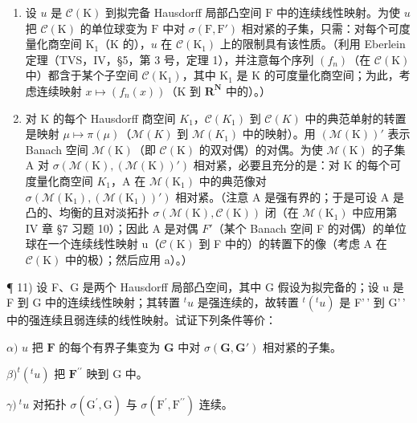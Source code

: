 \begin{enumerate}
\def\labelenumi{\alph{enumi})}
\item
  设 \(u\) 是 \(\mathcal{C}(\mathrm{K})\) 到拟完备 Hausdorff 局部凸空间 \(\mathrm{F}\) 中的连续线性映射。为使 \(u\) 把 \(\mathcal{C}(\mathrm{K})\) 的单位球变为 \(\mathrm{F}\) 中对 \(\sigma(\mathrm{F},\mathrm{F}')\) 相对紧的子集，只需：对每个可度量化商空间 \(\mathrm{K}_1\)（\(\mathrm{K}\) 的），\(u\) 在 \(\mathcal{C}(\mathrm{K}_1)\) 上的限制具有该性质。（利用 Eberlein 定理（TVS，IV，§5，第 3 号，定理 1），并注意每个序列 \((f_n)\)（在 \(\mathcal{C}(\mathrm{K})\) 中）都含于某个子空间 \(\mathcal{C}(\mathrm{K}_1)\)，其中 \(\mathrm{K}_1\) 是 \(\mathrm{K}\) 的可度量化商空间；为此，考虑连续映射 \(x \mapsto (f_n(x))\)（\(\mathrm{K}\) 到 \(\mathbf{R}^{\mathbf{N}}\) 中的）。）
\item
  对 K 的每个 Hausdorff 商空间 \(K_{1}\)，\(\mathcal{C}(K_{1})\) 到 \(\mathcal{C}(K)\) 中的典范单射的转置是映射 \(\mu\mapsto\pi(\mu)\)（\(\mathcal{M}(K)\) 到 \(\mathcal{M}(K_{1})\) 中的映射）。用 \((\mathcal{M}(\mathrm{K}))'\) 表示 Banach 空间 \(\mathcal{M}(\mathrm{K})\)（即 \(\mathcal{C}(\mathrm{K})\) 的双对偶）的对偶。为使 \(\mathcal{M}(\mathrm{K})\) 的子集 A 对 \(\sigma(\mathcal{M}(\mathrm{K}),(\mathcal{M}(\mathrm{K}))')\) 相对紧，必要且充分的是：对 K 的每个可度量化商空间 \(K_{1}\)，A 在 \(\mathcal{M}(\mathrm{K}_{1})\) 中的典范像对 \(\sigma(\mathcal{M}(\mathrm{K}_{1}),(\mathcal{M}(\mathrm{K}_{1}))')\) 相对紧。（注意 A 是强有界的；于是可设 A 是凸的、均衡的且对淡拓扑 \(\sigma(\mathcal{M}(\mathrm{K}),\mathcal{C}(\mathrm{K}))\) 闭（在 \(\mathcal{M}(\mathrm{K}_{1})\) 中应用第 IV 章 §7 习题 10）；因此 A 是对偶 \(F'\)（某个 Banach 空间 F 的对偶）的单位球在一个连续线性映射 u（\(\mathcal{C}(\mathrm{K})\) 到 F 中的）的转置下的像（考虑 A 在 \(\mathcal{C}(\mathrm{K})\) 中的极）；然后应用 a）。）
\end{enumerate}

¶ 11) 设 F、G 是两个 Hausdorff 局部凸空间，其中 G 假设为拟完备的；设 u 是 F 到 G 中的连续线性映射；其转置 \(^{t}u\) 是强连续的，故转置 \(^{t}(^{t}u)\) 是 F'\,' 到 G'\,' 中的强连续且弱连续的线性映射。试证下列条件等价：

\(\alpha)\) \(u\) 把 \(\mathbf{F}\) 的每个有界子集变为 \(\mathbf{G}\) 中对 \(\sigma(\mathbf{G},\mathbf{G}')\) 相对紧的子集。

\(\beta)^{t}(^{t}u)\) 把 \(\mathbf{F}^{\prime \prime}\) 映到 G 中。

\(\gamma)\ ^{t}u\) 对拓扑 \(\sigma(\mathrm{G}^{\prime},\mathrm{G})\) 与 \(\sigma(\mathrm{F}^{\prime},\mathrm{F}^{\prime\prime})\) 连续。

